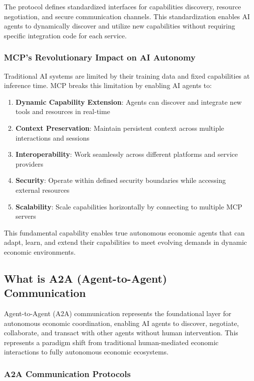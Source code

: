 \documentclass[12pt,a4paper]{article}
\begin{document}
The protocol defines standardized interfaces for capabilities discovery, resource negotiation, and secure communication channels. This standardization enables AI agents to dynamically discover and utilize new capabilities without requiring specific integration code for each service.

\subsubsection{MCP's Revolutionary Impact on AI Autonomy}

Traditional AI systems are limited by their training data and fixed capabilities at inference time. MCP breaks this limitation by enabling AI agents to:

\begin{enumerate}
\item \textbf{Dynamic Capability Extension}: Agents can discover and integrate new tools and resources in real-time
\item \textbf{Context Preservation}: Maintain persistent context across multiple interactions and sessions
\item \textbf{Interoperability}: Work seamlessly across different platforms and service providers
\item \textbf{Security}: Operate within defined security boundaries while accessing external resources
\item \textbf{Scalability}: Scale capabilities horizontally by connecting to multiple MCP servers
\end{enumerate}

This fundamental capability enables true autonomous economic agents that can adapt, learn, and extend their capabilities to meet evolving demands in dynamic economic environments.

\subsection{What is A2A (Agent-to-Agent) Communication}

Agent-to-Agent (A2A) communication represents the foundational layer for autonomous economic coordination, enabling AI agents to discover, negotiate, collaborate, and transact with other agents without human intervention. This represents a paradigm shift from traditional human-mediated economic interactions to fully autonomous economic ecosystems.

\subsubsection{A2A Communication Protocols}
\end{document}
